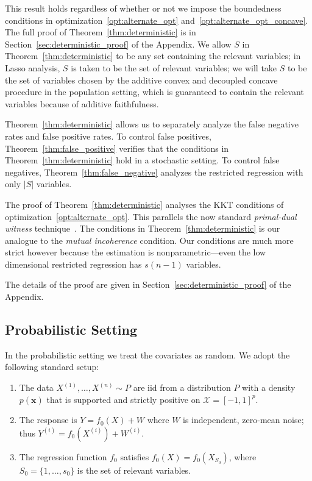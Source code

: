 This result holds regardless of whether or not we impose the boundedness conditions in optimization~\eqref{opt:alternate_opt} and~\eqref{opt:alternate_opt_concave}.
The full proof of Theorem~\ref{thm:deterministic} is in Section~\ref{sec:deterministic_proof} of the Appendix. We allow $S$ in Theorem~\ref{thm:deterministic} to be any set containing the relevant variables; in Lasso analysis, $S$ is taken to be the set of relevant variables; we will take $S$ to be the set of variables chosen by the additive convex and decoupled concave procedure in the population setting, which is guaranteed to contain the relevant variables because of additive faithfulness.

Theorem~\ref{thm:deterministic} allows us to separately analyze the false negative
rates and false positive rates. To control false positives,
Theorem~\ref{thm:false_positive} verifies that the conditions in Theorem~\ref{thm:deterministic} hold in a stochastic setting. To control
false negatives, Theorem~\ref{thm:false_negative} analyzes the restricted regression with only $|S|$ variables.

The proof of Theorem~\ref{thm:deterministic} analyses the KKT
conditions of optimization~\eqref{opt:alternate_opt}.  This parallels
the now standard \emph{primal-dual witness}
technique~\citep{wainwright2009sharp}. The conditions in Theorem~\ref{thm:deterministic} is our analogue to the \emph{mutual incoherence} condition. Our conditions are much more strict however because the estimation is
nonparametric---even the low dimensional restricted regression has
$s(n-1)$ variables. 

The details of the proof are given in
Section~\ref{sec:deterministic_proof} of the Appendix.

\subsection{Probabilistic Setting}
\label{sec:probabilistic_setting}

In the probabilistic setting we treat the covariates as random.  We
adopt the following standard setup:

\begin{enumerate}
\item The data $X^{(1)},\ldots, X^{(n)} \sim P$ are iid from
a distribution $P$ with a density $p(\mathbf{x})$ that is supported and strictly positive on $\mathcal{X}=[-1,1]^p$.
\item The response is $Y = f_0(X) + W$ where $W$ is
  independent, zero-mean noise; thus $Y^{(i)} = f_0(X^{(i)}) + W^{(i)}$.
\item The regression function $f_0$ satisfies
$f_0(X) = f_0(X_{S_0})$, where $S_0 = \{1,\ldots,s_0\}$ is the set of
relevant variables.
\end{enumerate}


